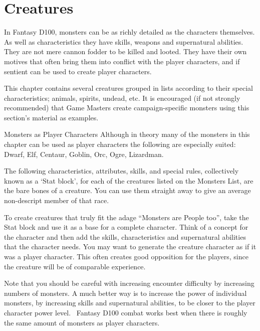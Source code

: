 \chapter{Creatures}
\label{ch:creatures}

In Fantasy D100, monsters can be as richly detailed as the characters themselves. As well as characteristics they have skills, weapons and supernatural abilities. They are not mere cannon fodder to be killed and looted. They have their own motives that often bring them into conflict with the player characters, and if sentient can be used to create player characters.

This chapter contains several creatures grouped in lists according to their special characteristics; animals, spirits, undead, etc. It is encouraged (if not strongly recommended) that Game Masters create campaign-specific monsters using this section's material as examples.
\vspace{1em}

\begin{rpg-titlebox}{Monsters as Player Characters}
Although in theory many of the monsters in this chapter can be used as player characters the following are especially suited: Dwarf, Elf, Centaur, Goblin, Orc, Ogre, Lizardman.
\end{rpg-titlebox}
  
The following characteristics, attributes, skills, and special rules, collectively known as a ‘Stat block’, for each of the creatures listed on the Monsters List, are the bare bones of a creature. You can use them straight away to give an average non-descript member of that race.

To create creatures that truly fit the adage “Monsters are People too”, take the Stat block and use it as a base for a complete character. Think of a concept for the character and then add the skills, characteristics and supernatural abilities that the character needs. You may want to generate the creature character as if it was a player character. This often creates good opposition for the players, since the creature will be of comparable experience. 

Note that you should be careful with increasing encounter difficulty by increasing numbers of monsters. A much better way is to increase the power of individual monsters, by increasing skills and supernatural abilities, to be closer to the player character power level.  Fantasy D100 combat works best when there is roughly the same amount of monsters as player characters.

